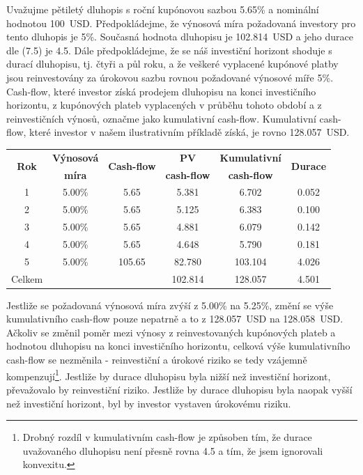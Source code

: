 \documentclass[a4paper]{book}
\begin{document}
Uvažujme pětiletý dluhopis s roční kupónovou sazbou 5.65\% a nominální hodnotou 100~USD. Předpokládejme, že výnosová míra požadovaná investory pro tento dluhopis je 5\%. Současná hodnota dluhopisu je 102.814~USD a jeho durace dle (7.5) je 4.5. Dále předpokládejme, že se náš investiční horizont shoduje s durací dluhopisu, tj. čtyři a půl roku, a že veškeré vyplacené kupónové platby jsou reinvestovány za úrokovou sazbu rovnou požadované výnosové míře 5\%. Cash-flow, které investor získá prodejem dluhopisu na konci investičního horizontu, z kupónových plateb vyplacených v průběhu tohoto období a z reinvestičních výnosů, označme jako kumulativní cash-flow. Kumulativní cash-flow, které investor v našem ilustrativním příkladě získá, je rovno 128.057~USD.
\begin{center}
\begin{tabular}{c c c c c c}
\multirow{2}{*}{\textbf{Rok}} &  \textbf{Výnosová} & \multirow{2}{*}{\textbf{Cash-flow}} & \textbf{PV} & \textbf{Kumulativní} & \multirow{2}{*}{\textbf{Durace}}\\
 & \textbf{míra} & & \textbf{cash-flow} & \textbf{cash-flow} & \\
\hline
1 & 5.00\% &   5.65 &   5.381 &   6.702 & 0.052\\
2 & 5.00\% &   5.65 &   5.125 &   6.383 & 0.100\\
3 & 5.00\% &   5.65 &   4.881 &   6.079 & 0.142\\
4 & 5.00\% &   5.65 &   4.648 &   5.790 & 0.181\\
5 & 5.00\% & 105.65 &  82.780 & 103.104 & 4.026\\				
Celkem  & & & 102.814 & 128.057 & 4.501\\
\end{tabular}
\end{center}
Jestliže se požadovaná výnosová míra zvýší z 5.00\% na 5.25\%, změní se výše kumulativního cash-flow pouze nepatrně a to z 128.057~USD na 128.058~USD. Ačkoliv se změnil poměr mezi výnosy z reinvestovaných kupónových plateb a hodnotou dluhopisu na konci investičního horizontu, celková výše kumulativního cash-flow se nezměnila -  reinvestiční a úrokové riziko se tedy vzájemně kompenzují\footnote{Drobný rozdíl v kumulativním cash-flow je způsoben tím, že durace uvažovaného dluhopisu není přesně rovna 4.5 a tím, že jsem ignorovali konvexitu.}. Jestliže by durace dluhopisu byla nižší než investiční horizont, převažovalo by reinvestiční riziko. Jestliže by durace dluhopisu byla naopak vyšší než investiční horizont, byl by investor vystaven úrokovému riziku.
\end{document}
